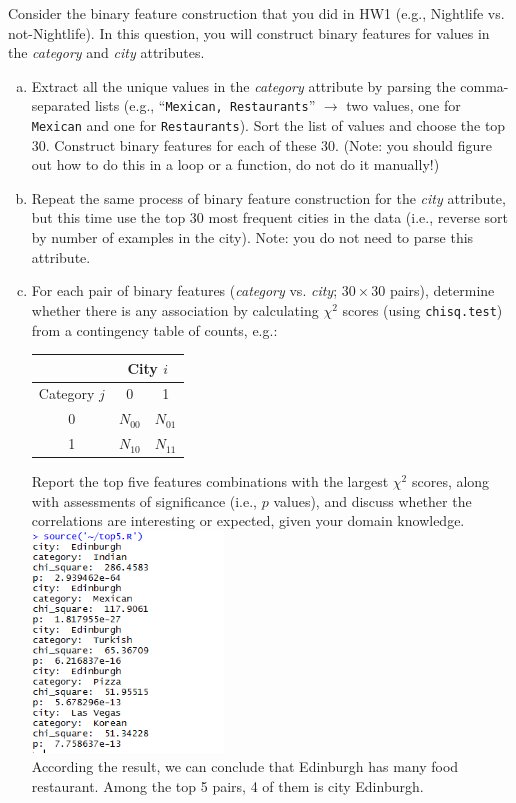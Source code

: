 \documentclass[11pt]{article}
\begin{document}
Consider the binary feature construction that you did in HW1 (e.g., Nightlife vs. not-Nightlife). In this question, you will construct binary features for values in the {\em category} and {\em city} attributes.

\begin{enumerate}[(a)]
\item Extract all the unique values in the {\em category} attribute by parsing the comma-separated lists (e.g., ``\texttt{Mexican, Restaurants}'' $\rightarrow$ two values, one for \texttt{Mexican} and one for \texttt{Restaurants}). Sort the list of values and choose the top 30. Construct binary features for each of these 30. (Note: you should figure out how to do this in a loop or a function, do not do it manually!)
\item Repeat the same process of binary feature construction for the {\em city} attribute, but this time use the top 30 most frequent cities in the data (i.e., reverse sort by number of examples in the city). Note: you do not need to parse this attribute.
\item For each pair of binary features ({\em category} vs. {\em city}; $30 \times 30$ pairs), determine whether there is any association by calculating $\chi^2$ scores (using \texttt{chisq.test}) from a contingency table of counts, e.g.:
\begin{table}[htdp] 
\begin{center}
\begin{tabular}{|c|c|c|}
\hline
& \multicolumn{2}{|c|}{City $i$}\\
 \hline
 Category $j$ &  0 & 1\\
 \hline
0 & ${N}_{00}$ & $N_{01}$ \\
 1 & $N_{10}$ & $N_{11}$ \\
\hline
\end{tabular}
\end{center}
\label{default}
\end{table}%

Report the top five features combinations with the largest $\chi^2$ scores, along with assessments of significance (i.e., $p$ values), and discuss whether the correlations are interesting or expected, given your domain knowledge. \\

\includegraphics[width=2in]{top5.png}\\
According the result, we can conclude that Edinburgh has many food restaurant. Among the top 5 pairs, 4 of them is city Edinburgh.


\end{enumerate}
\end{document}
